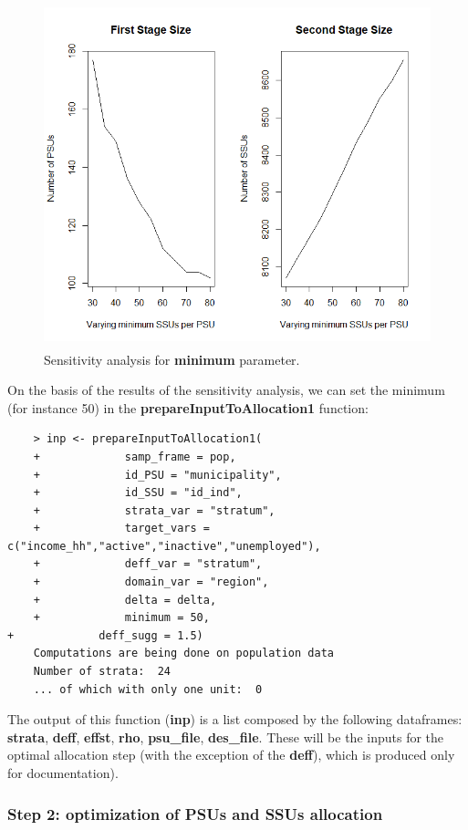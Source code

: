 \begin{figure} [h!]
	\centering
	\includegraphics[width=14cm,height=10cm]{Plot_min_SSU.png}
	\caption{Sensitivity analysis for \textbf{minimum} parameter.}
	\label{PlotMinimum}
\end{figure}

On the basis of the results of the sensitivity analysis, we can set the minimum (for instance 50) in the \textbf{prepareInputToAllocation1} function:
\begin{verbatim}
	> inp <- prepareInputToAllocation1(
	+             samp_frame = pop,
	+             id_PSU = "municipality",
	+             id_SSU = "id_ind",
	+             strata_var = "stratum",
	+             target_vars = c("income_hh","active","inactive","unemployed"),
	+             deff_var = "stratum",
	+             domain_var = "region",
	+             delta = delta,     
	+             minimum = 50,
+             deff_sugg = 1.5)
	Computations are being done on population data
	Number of strata:  24
	... of which with only one unit:  0
\end{verbatim}

The output of this function (\textbf{inp}) is a list composed by the following dataframes:
\textbf{strata},
\textbf{deff},
\textbf{effst},
\textbf{rho}, 
\textbf{psu\_file}, 
\textbf{des\_file}.
These will be the inputs for the optimal allocation step (with the exception of the \textbf{deff}), which is produced only for documentation).

\subsubsection{Step 2: optimization of PSUs and SSUs allocation}

